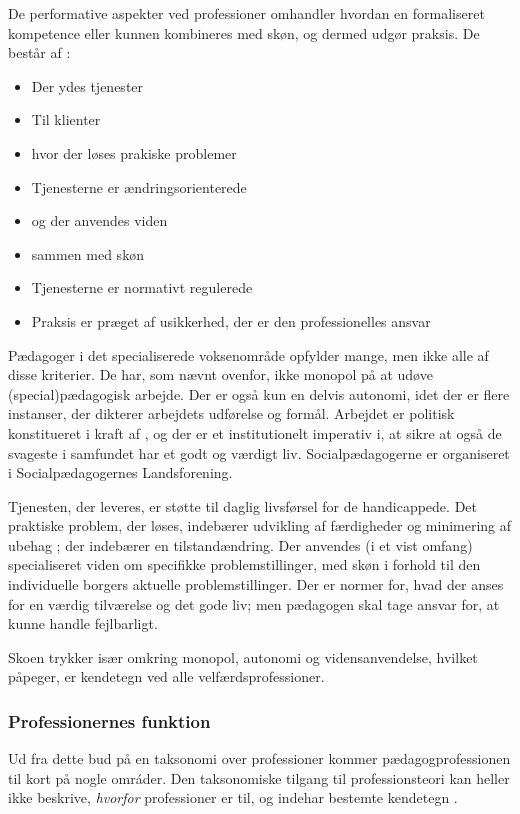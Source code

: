 De performative aspekter ved professioner omhandler hvordan en formaliseret kompetence eller kunnen kombineres med skøn, og dermed udgør praksis. De består af \autocite[s 19ff]{molanderProfesjonsstudierIntroduksjon2008}:
\begin{itemize}
  \item
    Der ydes tjenester
  \item
    Til klienter
  \item
    hvor der løses prakiske problemer
  \item
    Tjenesterne er ændringsorienterede
  \item
    og der anvendes viden
  \item
    sammen med skøn
  \item
    Tjenesterne er normativt regulerede
  \item
    Praksis er præget af usikkerhed, der er den professionelles ansvar
\end{itemize}

Pædagoger i det specialiserede voksenområde opfylder mange, men ikke alle af disse kriterier.
De har, som nævnt ovenfor, ikke monopol på at udøve (special)pædagogisk arbejde.
Der er også kun en delvis autonomi, idet der er flere instanser, der dikterer arbejdets udførelse og formål. 
Arbejdet er politisk konstitueret i kraft af \autocite{sociallatex-ogindenrigsministerietBekendtgorelseAfLov2019}, og der er et institutionelt imperativ i, at sikre at også de svageste i samfundet har et godt og værdigt liv.
Socialpædagogerne er organiseret i Socialpædagogernes Landsforening.

Tjenesten, der leveres, er støtte til daglig livsførsel for de handicappede.
Det praktiske problem, der løses, indebærer udvikling af færdigheder og minimering af ubehag ; der indebærer en tilstandændring.
Der anvendes (i et vist omfang) specialiseret viden om specifikke problemstillinger, med skøn i forhold til den individuelle borgers aktuelle problemstillinger.
Der er normer for, hvad der anses for en værdig tilværelse og det gode liv; men pædagogen skal tage ansvar for, at kunne handle fejlbarligt.

Skoen trykker især omkring monopol, autonomi og vidensanvendelse, hvilket \citeauthor{frederiksenVelfaerdsprofessionerMellemOmsorg2017} påpeger, er kendetegn ved alle velfærdsprofessioner.

\subsubsection{Professionernes funktion}
Ud fra dette bud på en taksonomi over professioner kommer pædagogprofessionen til kort på nogle omráder.
Den taksonomiske tilgang til professionsteori kan heller ikke beskrive, \textit{hvorfor} professioner er til, og indehar bestemte kendetegn \autocite[s. 450]{frederiksenVelfaerdsprofessionerMellemOmsorg2017}.


